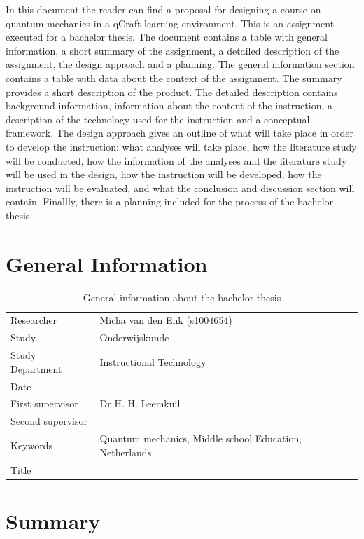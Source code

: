 \documentclass[12pt]{report} %
\begin{document}
In this document the reader can find a proposal for designing a course on quantum mechanics in a qCraft learning environment. This is an assignment executed for a bachelor thesis. The document contains a table with general information, a short summary of the assignment, a detailed description of the assignment, the design approach and a planning. The general information section contains a table with data about the context of the assignment. The summary provides a short description of the product. The detailed description contains background information, information about the content of the instruction, a description of the technology used for the instruction and a conceptual framework. The design approach gives an outline of what will take place in order to develop the instruction: what analyses will take place, how the literature study will be conducted, how the information of the analyses and the literature study will be used in the design, how the instruction will be developed, how the instruction will be evaluated, and what the conclusion and discussion section will contain. Finallly, there is a planning included for the process of the bachelor thesis.

\chapter{General Information}

\begin{table}[h]
\begin{center}
\begin{tabular}{ l p{8cm} }
Researcher & Micha van den Enk (s1004654) \\
Study & Onderwijskunde \\
Study Department & Instructional Technology \\ 
Date & \\
First supervisor & Dr H. H. Leemkuil \\
Second supervisor & \\
Keywords & Quantum mechanics, Middle school Education, Netherlands \\
Title & \\
\end{tabular}
\end{center}
\caption{\footnotesize General information about the bachelor thesis}
\end{table}

\chapter{Summary}
\end{document}
